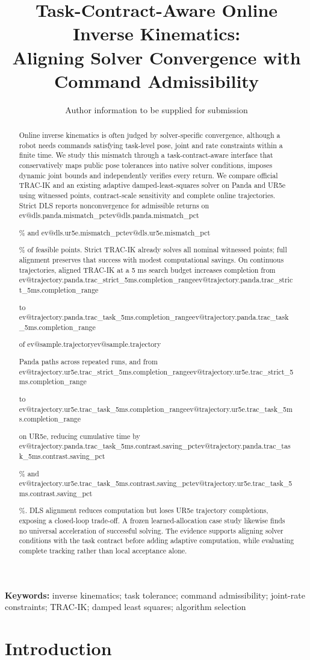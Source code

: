\documentclass[10pt,a4paper]{article}
\title{\textbf{Task-Contract-Aware Online Inverse Kinematics:\\
Aligning Solver Convergence with Command Admissibility}}
\author{Author information to be supplied for submission}
\date{}
\makeatletter
\newcommand{\ev}[1]{\ifcsname ev@#1\endcsname\csname ev@#1\endcsname\else\PackageError{evidence}{Undefined evidence key #1}{}\fi}
\makeatother
\begin{document}
\maketitle
\begin{abstract}
Online inverse kinematics is often judged by solver-specific convergence, although
a robot needs commands satisfying task-level pose, joint and rate constraints
within a finite time. We study this mismatch through a task-contract-aware
interface that conservatively maps public pose tolerances into native solver
conditions, imposes dynamic joint bounds and independently verifies every return.
We compare official TRAC-IK and an existing adaptive damped-least-squares solver
on Panda and UR5e using witnessed points, contract-scale sensitivity and complete
online trajectories. Strict DLS reports nonconvergence for admissible returns on
\ev{dls.panda.mismatch_pct}\% and \ev{dls.ur5e.mismatch_pct}\% of feasible points.
Strict TRAC-IK already solves all nominal witnessed points; full alignment
preserves that success with modest computational savings.
On continuous trajectories, aligned TRAC-IK at a 5 ms search budget increases
completion from \ev{trajectory.panda.trac_strict_5ms.completion_range} to
\ev{trajectory.panda.trac_task_5ms.completion_range} of \ev{sample.trajectory}
Panda paths across repeated runs, and from
\ev{trajectory.ur5e.trac_strict_5ms.completion_range} to
\ev{trajectory.ur5e.trac_task_5ms.completion_range} on UR5e, reducing cumulative time by
\ev{trajectory.panda.trac_task_5ms.contrast.saving_pct}\% and
\ev{trajectory.ur5e.trac_task_5ms.contrast.saving_pct}\%.
DLS alignment reduces computation but loses UR5e trajectory completions, exposing
a closed-loop trade-off. A frozen learned-allocation case study likewise finds no
universal acceleration of successful solving. The evidence supports aligning
solver conditions with the task contract before adding adaptive computation,
while evaluating complete tracking rather than local acceptance alone.
\end{abstract}
\noindent\textbf{Keywords:} inverse kinematics; task tolerance; command admissibility;
joint-rate constraints; TRAC-IK; damped least squares; algorithm selection


\section{Introduction}
\label{sec:introduction}
\end{document}
